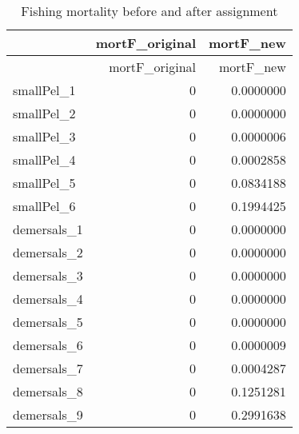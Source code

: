 \documentclass[
]{article}
\begin{document}
\begin{longtable}[]{@{}lrr@{}}
\caption{Fishing mortality before and after assignment}\tabularnewline
\toprule()
& mortF\_original & mortF\_new \\
\midrule()
\endfirsthead
\toprule()
& mortF\_original & mortF\_new \\
\midrule()
\endhead
smallPel\_1 & 0 & 0.0000000 \\
smallPel\_2 & 0 & 0.0000000 \\
smallPel\_3 & 0 & 0.0000006 \\
smallPel\_4 & 0 & 0.0002858 \\
smallPel\_5 & 0 & 0.0834188 \\
smallPel\_6 & 0 & 0.1994425 \\
demersals\_1 & 0 & 0.0000000 \\
demersals\_2 & 0 & 0.0000000 \\
demersals\_3 & 0 & 0.0000000 \\
demersals\_4 & 0 & 0.0000000 \\
demersals\_5 & 0 & 0.0000000 \\
demersals\_6 & 0 & 0.0000009 \\
demersals\_7 & 0 & 0.0004287 \\
demersals\_8 & 0 & 0.1251281 \\
demersals\_9 & 0 & 0.2991638 \\
\bottomrule()
\end{longtable}
\end{document}
